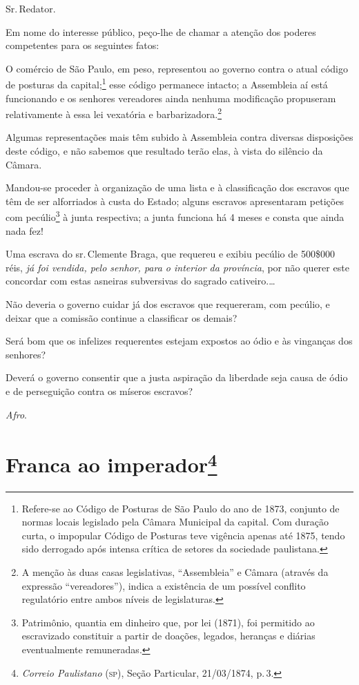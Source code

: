Sr.\,Redator.

Em nome do interesse público, peço-lhe de chamar a atenção dos poderes
competentes para os seguintes fatos:

O comércio de São Paulo, em peso, representou ao governo contra o atual
código de posturas da capital;\footnote{ Refere-se ao Código de
  Posturas de São Paulo do ano de 1873, conjunto de normas locais
  legislado pela Câmara Municipal da capital. Com duração curta, o
  impopular Código de Posturas teve vigência apenas até 1875, tendo sido
  derrogado após intensa crítica de setores da sociedade paulistana.}
esse código permanece intacto; a Assembleia aí está funcionando e os
senhores vereadores ainda nenhuma modificação propuseram relativamente à
essa lei vexatória e barbarizadora.\footnote{ A menção às duas casas
  legislativas, ``Assembleia'' e Câmara (através da expressão
  ``vereadores''), indica a existência de um possível conflito regulatório
  entre ambos níveis de legislaturas.}

Algumas representações mais têm subido à Assembleia contra diversas
disposições deste código, e não sabemos que resultado terão elas, à
vista do silêncio da Câmara.

Mandou-se proceder à organização de uma lista e à classificação dos
escravos que têm de ser alforriados à custa do Estado; alguns escravos
apresentaram petições com pecúlio\footnote{ Patrimônio, quantia em
  dinheiro que, por lei (1871), foi permitido ao escravizado constituir
  a partir de doações, legados, heranças e diárias eventualmente
  remuneradas.} à junta respectiva; a junta funciona há 4 meses e consta
que ainda nada fez!

Uma escrava do sr.\,Clemente Braga, que requereu e exibiu pecúlio de
500\$000 réis, \emph{já foi vendida, pelo senhor, para o interior da
província}, por não querer este concordar com estas asneiras subversivas
do sagrado cativeiro.\ldots{}

Não deveria o governo cuidar já dos escravos que requereram, com
pecúlio, e deixar que a comissão continue a classificar os demais?

Será bom que os infelizes requerentes estejam expostos ao ódio e às
vinganças dos senhores?

Deverá o governo consentir que a justa aspiração da liberdade seja causa
de ódio e de perseguição contra os míseros escravos?

\emph{Afro}.

\chapter{Franca ao imperador\footnote{\emph{Correio Paulistano} (\textsc{sp}), Seção Particular,
  21/03/1874, p.\,3.}} %

